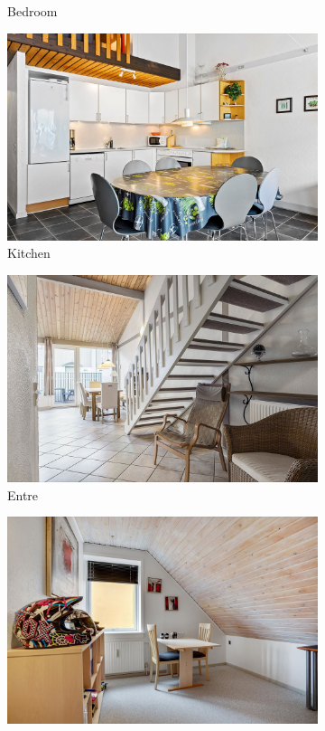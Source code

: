 \begin{figure}[H]
\begin{subfigure}{0.3\textwidth}
    \caption{Bedroom}
  \end{subfigure}
  \medskip
  \begin{subfigure}{0.3\textwidth}
    \includegraphics[width=\linewidth]{pictures/random/bexample_kitchen}
    \caption{Kitchen}
  \end{subfigure}\hfil %
  \begin{subfigure}{0.3\textwidth}
    \includegraphics[width=\linewidth]{pictures/random/bexample_entre}
    \caption{Entre}
  \end{subfigure}\hfil %
  \begin{subfigure}{0.3\textwidth}
    \includegraphics[width=\linewidth]{pictures/random/bexample_diningroom}

\end{subfigure}
\end{figure}
